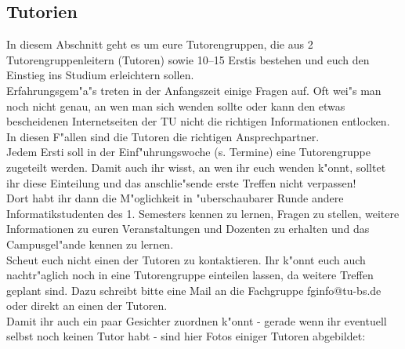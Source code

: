 \subsection{Tutorien}

In diesem Abschnitt geht es um eure Tutorengruppen, die aus 2 Tutorengruppenleitern (Tutoren) sowie 10--15 Erstis bestehen und euch den Einstieg ins Studium erleichtern sollen.\\
Erfahrungsgem"a"s treten in der Anfangszeit einige Fragen auf. Oft wei"s man noch nicht genau, an wen man sich wenden sollte oder kann den etwas bescheidenen Internetseiten der TU nicht die richtigen Informationen entlocken. In diesen F"allen sind die Tutoren die richtigen Ansprechpartner.\\
Jedem Ersti soll in der Einf"uhrungswoche (s. Termine) eine Tutorengruppe zugeteilt werden. Damit auch ihr wisst, an wen ihr euch wenden k"onnt, solltet ihr diese Einteilung und das anschlie"sende erste Treffen nicht verpassen!\\
Dort habt ihr dann die M"oglichkeit in "uberschaubarer Runde andere Informatikstudenten des 1. Semesters kennen zu lernen, Fragen zu stellen, weitere Informationen zu euren Veranstaltungen und Dozenten zu erhalten und das Campusgel"ande kennen zu lernen.\\
Scheut euch nicht einen der Tutoren zu kontaktieren. Ihr k"onnt euch auch nachtr"aglich noch in eine Tutorengruppe einteilen lassen, da weitere Treffen geplant sind. Dazu schreibt bitte eine Mail an die Fachgruppe fginfo@tu-bs.de oder direkt an einen der Tutoren.\\
Damit ihr auch ein paar Gesichter zuordnen k"onnt - gerade wenn ihr eventuell selbst noch keinen Tutor habt - sind hier Fotos einiger Tutoren abgebildet:

\onecolumn

